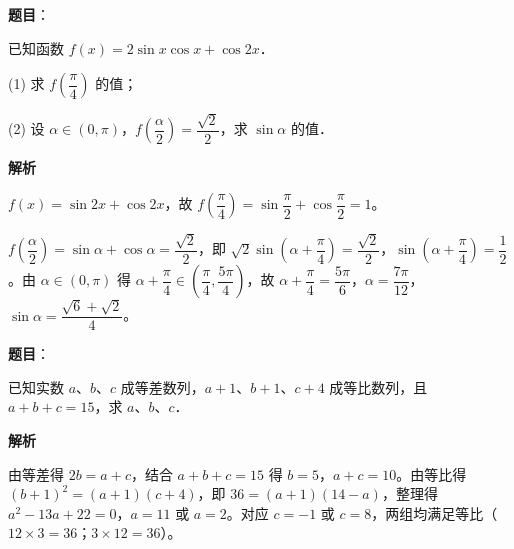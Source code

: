 \begin{answer}

\textbf{题目}：

已知函数 $f(x) = 2\sin x\cos x + \cos 2x$．

(1) 求 $f\left(\dfrac{\pi}{4}\right)$ 的值；

(2) 设 $\alpha \in (0, \pi)$，$f\left(\dfrac{\alpha}{2}\right) = \dfrac{\sqrt{2}}{2}$，求 $\sin\alpha$ 的值．

\textbf{解析}


$f(x) = \sin 2x + \cos 2x$，故 $f\left(\dfrac{\pi}{4}\right) = \sin\dfrac{\pi}{2} + \cos\dfrac{\pi}{2} = 1$。


$f\left(\dfrac{\alpha}{2}\right) = \sin\alpha + \cos\alpha = \dfrac{\sqrt{2}}{2}$，即 $\sqrt{2}\sin\left(\alpha + \dfrac{\pi}{4}\right) = \dfrac{\sqrt{2}}{2}$，$\sin\left(\alpha + \dfrac{\pi}{4}\right) = \dfrac{1}{2}$。由 $\alpha \in (0, \pi)$ 得 $\alpha + \dfrac{\pi}{4} \in \left(\dfrac{\pi}{4}, \dfrac{5\pi}{4}\right)$，故 $\alpha + \dfrac{\pi}{4} = \dfrac{5\pi}{6}$，$\alpha = \dfrac{7\pi}{12}$，$\sin\alpha = \dfrac{\sqrt{6} + \sqrt{2}}{4}$。



\end{answer}
\begin{answer}

\textbf{题目}：

已知实数 $a$、$b$、$c$ 成等差数列，$a + 1$、$b + 1$、$c + 4$ 成等比数列，且 $a + b + c = 15$，求 $a$、$b$、$c$．

\textbf{解析}

由等差得 $2b = a + c$，结合 $a + b + c = 15$ 得 $b = 5$，$a + c = 10$。由等比得 $(b + 1)^2 = (a + 1)(c + 4)$，即 $36 = (a + 1)(14 - a)$，整理得 $a^2 - 13a + 22 = 0$，$a = 11$ 或 $a = 2$。对应 $c = -1$ 或 $c = 8$，两组均满足等比（$12 \times 3 = 36$；$3 \times 12 = 36$）。


\end{answer}
